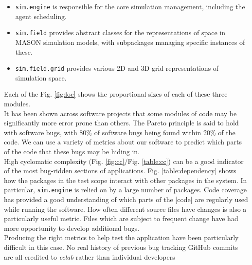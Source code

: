 \documentclass[11pt]{article}
\begin{document}
\begin{itemize}
\item \texttt{sim.engine} is responsible for the core simulation management, including the agent scheduling.
\item \texttt{sim.field} provides abstract classes for the representations of space in MASON simulation models, with subpackages managing specific instances of these.
\item \texttt{sim.field.grid} provides various 2D and 3D grid representations of simulation space.
\end{itemize}

Each of the Fig. \ref{fig:loc} shows the proportional sizes of each of these three modules.
\\

It has been shown across software projects that some modules of code may be significantly more error prone than others.
The Pareto principle is said to hold with software bugs, with 80\% of software bugs being found within 20\% of the code\cite[pp. 124]{pressman}.
We can use a variety of metrics about our software to predict which parts of the code that these bugs may be hiding in\cite{predicting_from_history}.
\\

High cyclomatic complexity (Fig. \ref{fig:cc}/Fig. \ref{table:cc}) can be a good indicator of the most bug-ridden sections of applications.
Fig. \ref{table:dependency} shows how the packages in the test scope interact with other packages in the system. In particular, \texttt{sim.engine} is relied on by a large number of packages.
Code coverage has provided a good understanding of which parts of the [code] are regularly used while running the software.
How often different source files have changes is also a particularly useful metric. Files which are subject to frequent change have had more opportunity to develop additional bugs.
\\

Producing the right metrics to help test the application have been particularly difficult in this case.
No real history of previous bug tracking
GitHub commits are all credited to \textit{eclab} rather than individual developers
\\
\end{document}
